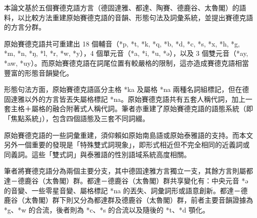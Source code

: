 \vspace{-1.15cm}
本論文基於五個賽德克語方言（德固達雅、都達、陶賽、德鹿谷、太魯閣）的語料，以比較方法重建原始賽德克語的音韻、形態句法及詞彙系統，並提出賽德克語的方言分群。

原始賽德克語共可重建出 18 個輔音（*p, *t, *k, *q, *b, *d, *c, *s, *x, *h, *g, *m, *n, *ŋ, *l, *r, *w, *y），4 個單元音（*a, *i, *u, *ə），以及 3 個雙元音（*ay, *aw, *uy）。而原始賽德克語在詞尾位置有較嚴格的限制，這亦造成賽德克語相當豐富的形態音韻變化。

形態句法方面，原始賽德克語區分主格 *ka 及屬格 *na 兩種名詞組標記，但在德固達雅以外的方言皆丟失屬格標記 *na。原始賽德克語共有五套人稱代詞，加上一套主格＋屬格的融合附著式人稱代詞。筆者亦重建了原始賽德克語的語態系統（即「焦點系統」），包含四個語態及三套不同詞綴。

原始賽德克語的一些詞彙重建，須仰賴如原始南島語或原始泰雅語的支持。而本文另外一個重要的發現是「特殊雙式詞現象」，即形式相近但不完全相同的近義詞或同義詞。這些「雙式詞」與泰雅語的性別語域系統高度相關。

筆者將賽德克語分為兩個主要分支，其中德固達雅方言獨立一支，其餘方言則屬都達－德鹿谷（太魯閣）群。都達－德鹿谷（太魯閣）群共享變化有：中央元音 *ə 的音變、一些零星音變、屬格標記 *na 的丟失、詞彙詞形或語意創新。都達－德鹿谷（太魯閣）群下則又分為都達群及德鹿谷（太魯閣）群，前者主要音韻證據為 *g、*w 的合流，後者則為 *c、*s 的合流以及隨後的 *t、*d 顎化。